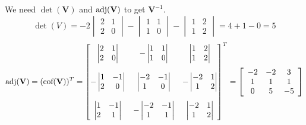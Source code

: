 \documentclass[12pt,a4paper]{article}
\begin{document}
\begin{solution}
We need $\det(\mathbf{V})$  and $\operatorname{adj}(\mathbf{V})$ to get $\mathbf{V}^{-1}$.
$$
\det (V) = -2
\begin{vmatrix}
    2 & 1\\
    2 & 0
\end{vmatrix}
-
\begin{vmatrix}
    1 & 1\\
    1 & 0
\end{vmatrix}
-
\begin{vmatrix}
    1 & 2\\
    1 & 2
\end{vmatrix}
=4+1-0=5
$$
\[
\operatorname{adj}(\mathbf{V}) = (\text{cof}(\mathbf{V}))^T =
\begin{bmatrix}
\begin{vmatrix}2 & 1\\2 & 0\end{vmatrix} & -\begin{vmatrix}1 & 1\\1 & 0\end{vmatrix} & \begin{vmatrix}1 & 2\\1 & 2\end{vmatrix}\\\\
-\begin{vmatrix}1 & -1\\2 & 0\end{vmatrix} & \begin{vmatrix}-2 & -1\\1 & 0\end{vmatrix} &-\begin{vmatrix}-2 & 1\\1 & 2\end{vmatrix}\\\\
\begin{vmatrix}1 & -1\\2 & 1\end{vmatrix}& -\begin{vmatrix}-2 & -1\\1 & 1\end{vmatrix}&
\begin{vmatrix}-2 & 1\\1 & 2\end{vmatrix}
\end{bmatrix}^T
=
\left[\begin{array}{ccc}
-2 & -2 & 3 \\
1 & 1 & 1 \\
0 & 5 & -5
\end{array}\right]
\]


\end{solution}
\end{document}
